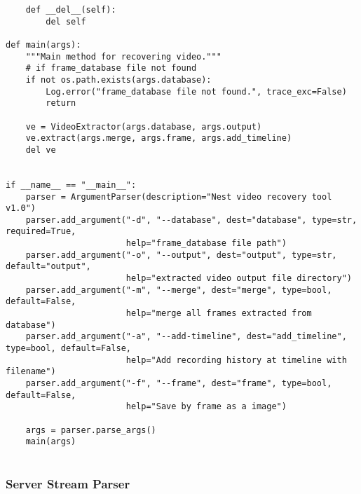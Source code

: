 \documentclass{easychair}
\begin{document}
\begin{lstlisting}
    def __del__(self):
        del self

def main(args):
    """Main method for recovering video."""
    # if frame_database file not found
    if not os.path.exists(args.database):
        Log.error("frame_database file not found.", trace_exc=False)
        return

    ve = VideoExtractor(args.database, args.output)
    ve.extract(args.merge, args.frame, args.add_timeline)
    del ve


if __name__ == "__main__":
    parser = ArgumentParser(description="Nest video recovery tool v1.0")
    parser.add_argument("-d", "--database", dest="database", type=str, required=True,
                        help="frame_database file path")
    parser.add_argument("-o", "--output", dest="output", type=str, default="output",
                        help="extracted video output file directory")
    parser.add_argument("-m", "--merge", dest="merge", type=bool, default=False,
                        help="merge all frames extracted from database")
    parser.add_argument("-a", "--add-timeline", dest="add_timeline", type=bool, default=False,
                        help="Add recording history at timeline with filename")
    parser.add_argument("-f", "--frame", dest="frame", type=bool, default=False,
                        help="Save by frame as a image")

    args = parser.parse_args()
    main(args)


\end{lstlisting}

\subsubsection{Server Stream Parser}
\end{document}
